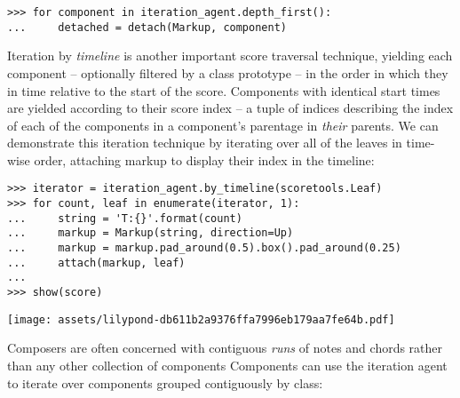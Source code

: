 \begin{abjadbookoutput}
\begin{singlespacing}
\vspace{-0.5\baselineskip}
\begin{lstlisting}
>>> for component in iteration_agent.depth_first():
...     detached = detach(Markup, component)
\end{lstlisting}
\end{singlespacing}
\end{abjadbookoutput}

\noindent Iteration by \emph{timeline} is another important score traversal
technique, yielding each component -- optionally filtered by a class prototype
-- in the order in which they in time relative to the start of the score.
Components with identical start times are yielded according to their score
index -- a tuple of indices describing the index of each of the components in a
component's parentage in \emph{their} parents. We can demonstrate this
iteration technique by iterating over all of the leaves in time-wise order,
attaching markup to display their index in the timeline:

\begin{comment}
<abjad>
iterator = iteration_agent.by_timeline(scoretools.Leaf)
for count, leaf in enumerate(iterator, 1):
    string = 'T:{}'.format(count)
    markup = Markup(string, direction=Up)
    markup = markup.pad_around(0.5).box().pad_around(0.25)
    attach(markup, leaf)

show(score)
</abjad>
\end{comment}

\begin{abjadbookoutput}
\begin{singlespacing}
\vspace{-0.5\baselineskip}
\begin{lstlisting}
>>> iterator = iteration_agent.by_timeline(scoretools.Leaf)
>>> for count, leaf in enumerate(iterator, 1):
...     string = 'T:{}'.format(count)
...     markup = Markup(string, direction=Up)
...     markup = markup.pad_around(0.5).box().pad_around(0.25)
...     attach(markup, leaf)
...
>>> show(score)
\end{lstlisting}
\noindent\texttt{[image: assets/lilypond-db611b2a9376ffa7996eb179aa7fe64b.pdf]}
\end{singlespacing}
\end{abjadbookoutput}

\noindent Composers are often concerned with contiguous \emph{runs} of notes
and chords rather than any other collection of components Components can use
the iteration agent to iterate over components grouped contiguously by class:

